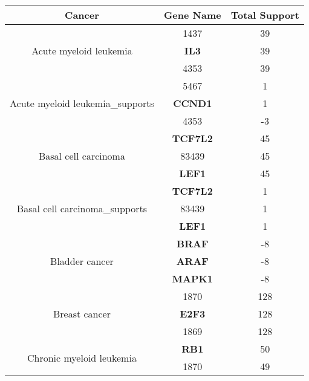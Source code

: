 \begin{table}[h!]
    \centering
    \begin{tabular}{|c|c|c|}
    \hline
    \textbf{Cancer} & \textbf{Gene Name} & \textbf{Total Support} \\ \hline
    \multirow{3}{*}{Acute myeloid leukemia} & 1437 & 39 \\ 

    \cline{2-3} & \textbf{IL3} & 39 \\
    
    \cline{2-3} & 4353 & 39 \\
    \hline\multirow{3}{*}{Acute myeloid leukemia_supports} & 5467 & 1 \\ 

    \cline{2-3} & \textbf{CCND1} & 1 \\
    
    \cline{2-3} & 4353 & -3 \\
    \hline\multirow{3}{*}{Basal cell carcinoma} & \textbf{TCF7L2} & 45 \\ 

    \cline{2-3} & 83439 & 45 \\
    
    \cline{2-3} & \textbf{LEF1} & 45 \\
    \hline\multirow{3}{*}{Basal cell carcinoma_supports} & \textbf{TCF7L2} & 1 \\ 

    \cline{2-3} & 83439 & 1 \\
    
    \cline{2-3} & \textbf{LEF1} & 1 \\
    \hline\multirow{3}{*}{Bladder cancer} & \textbf{BRAF} & -8 \\ 

    \cline{2-3} & \textbf{ARAF} & -8 \\
    
    \cline{2-3} & \textbf{MAPK1} & -8 \\
    \hline\multirow{3}{*}{Breast cancer} & 1870 & 128 \\ 

    \cline{2-3} & \textbf{E2F3} & 128 \\
    
    \cline{2-3} & 1869 & 128 \\
    \hline\multirow{3}{*}{Chronic myeloid leukemia} & \textbf{RB1} & 50 \\ 

    \cline{2-3} & 1870 & 49 \\
    

\end{tabular}
\end{table}
